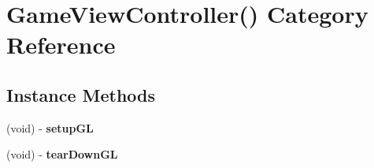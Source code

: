 \hypertarget{category_game_view_controller_07_08}{}\section{Game\+View\+Controller() Category Reference}
\label{category_game_view_controller_07_08}
\subsection*{Instance Methods}
\begin{DoxyCompactItemize}
\item 
(void) -\/ {\bfseries setup\+GL}\hypertarget{category_game_view_controller_07_08_a428d90a43c8732d980daa878bc0b796e}{}\label{category_game_view_controller_07_08_a428d90a43c8732d980daa878bc0b796e}

\item 
(void) -\/ {\bfseries tear\+Down\+GL}\hypertarget{category_game_view_controller_07_08_a126aab10acd38763920483fed64068ce}{}\label{category_game_view_controller_07_08_a126aab10acd38763920483fed64068ce}

\end{DoxyCompactItemize}
